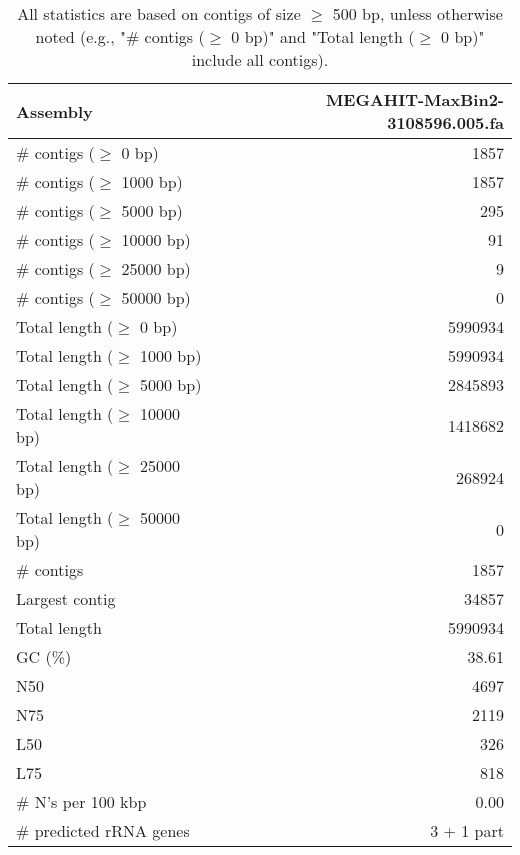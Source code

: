 \documentclass[12pt,a4paper]{article}
\begin{document}
\begin{table}[ht]
\begin{center}
\caption{All statistics are based on contigs of size $\geq$ 500 bp, unless otherwise noted (e.g., "\# contigs ($\geq$ 0 bp)" and "Total length ($\geq$ 0 bp)" include all contigs).}
\begin{tabular}{|l*{1}{|r}|}
\hline
Assembly & MEGAHIT-MaxBin2-3108596.005.fa \\ \hline
\# contigs ($\geq$ 0 bp) & 1857 \\ \hline
\# contigs ($\geq$ 1000 bp) & 1857 \\ \hline
\# contigs ($\geq$ 5000 bp) & 295 \\ \hline
\# contigs ($\geq$ 10000 bp) & 91 \\ \hline
\# contigs ($\geq$ 25000 bp) & 9 \\ \hline
\# contigs ($\geq$ 50000 bp) & 0 \\ \hline
Total length ($\geq$ 0 bp) & 5990934 \\ \hline
Total length ($\geq$ 1000 bp) & 5990934 \\ \hline
Total length ($\geq$ 5000 bp) & 2845893 \\ \hline
Total length ($\geq$ 10000 bp) & 1418682 \\ \hline
Total length ($\geq$ 25000 bp) & 268924 \\ \hline
Total length ($\geq$ 50000 bp) & 0 \\ \hline
\# contigs & 1857 \\ \hline
Largest contig & 34857 \\ \hline
Total length & 5990934 \\ \hline
GC (\%) & 38.61 \\ \hline
N50 & 4697 \\ \hline
N75 & 2119 \\ \hline
L50 & 326 \\ \hline
L75 & 818 \\ \hline
\# N's per 100 kbp & 0.00 \\ \hline
\# predicted rRNA genes & 3 + 1 part \\ \hline
\end{tabular}
\end{center}
\end{table}
\end{document}
